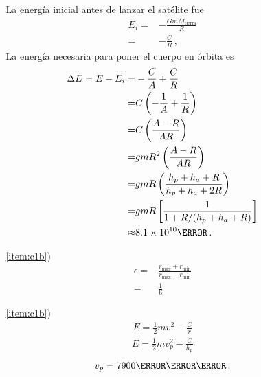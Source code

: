 \begin{enumerate}
\begin{itemize}
    La energía inicial antes de lanzar el satélite fue
    \begin{align*}
      E_i=&-\frac{GmM_{\text{tierra}}}{R}\nonumber\\
      =&-\frac{C}{R}\,,
    \end{align*}
    La energía necesaria para poner el cuerpo en órbita es
    \begin{align*}
      \Delta E=E-E_i=&-\frac{C}{A}+\frac{C}{R}\nonumber\\
      =&C\left( -\frac{1}{A}+\frac{1}{R}     \right)\nonumber\\
      =&C\left( \frac{A-R}{AR}     \right)\nonumber\\
      =&g m R^2\left( \frac{A-R}{AR}     \right)\nonumber\\
      =&g m R\left( \frac{h_p+h_a+R}{h_p+h_a+2R}     \right)\nonumber\\
      =&g m R\left[ \frac{1}{1+R/(h_p+h_a+R)}     \right]\nonumber\\
      \approx&8.1\times 10^{10}\joule\,.
    \end{align*}
   \item[\ref{item:c1b})]
     \begin{align*}
       \epsilon=&\frac{r_{\text{max}}+r_{\text{min}}}{r_{\text{max}}-r_{\text{min}}}\nonumber\\
       =&\frac{1}{6}
     \end{align*}
   \item[\ref{item:c1b})]
     \begin{align*}
       E=\frac{1}{2}mv^2-\frac{C}{r}
     \end{align*}
     \begin{align*}
       E=\frac{1}{2}mv_p^2-\frac{C}{h_p}
     \end{align*}
     \begin{align*}
       v_p=7900\meter\per\second\,.
     \end{align*}
    \end{itemize}


\end{enumerate}

\begin{extrapage}
  \newpage
  \qquad
  \newpage
\end{extrapage}


